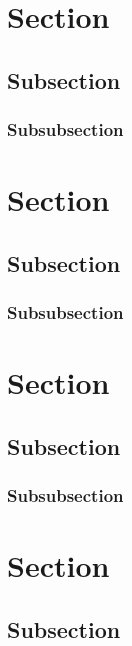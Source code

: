 \section{Section}
\lipsum[1] %

\subsection{Subsection}
\lipsum[2] %

\subsubsection{Subsubsection}
\lipsum[3] %

\section{Section}
\lipsum[1] %

\subsection{Subsection}
\lipsum[2] %

\subsubsection{Subsubsection}
\lipsum[3] %

\section{Section}
\lipsum[1] %

\subsection{Subsection}
\lipsum[2] %

\subsubsection{Subsubsection}
\lipsum[3] %

\section{Section}
\lipsum[1] %

\subsection{Subsection}
\lipsum[2] %

